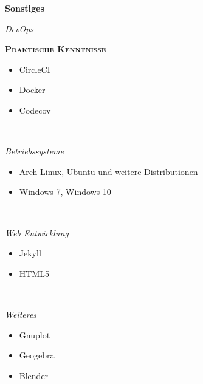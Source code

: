 \documentclass[8pt]{article}
\newcommand{\cvEducationHeading}[2]{%
  {\centering\colorbox{cvBackgroundColor}{\parbox{0.98\linewidth}{\textbf{#1} \hfill \textit{\footnotesize #2}}}} \par
}
\newenvironment{cvEducationItem}[2]{
  \medskip
  \par
  \begin{minipage}[c]{0.15\linewidth}
    \raggedleft
    \footnotesize
    \textit{#1}
  \end{minipage}
  \quad
  \vrule
  \quad
  \begin{minipage}[t]{0.7\linewidth}
    \textsc{\color{cvColor} \textbf{#2}}
    \footnotesize
    \begin{itemize}[itemsep=0mm, leftmargin=3mm]
}{
    \end{itemize}
  \end{minipage}
  \\[0.5em]
}
\begin{document}
  \newpage
  \cvEducationHeading{Sonstiges}{}
  \begin{multicols}{2}
  \begin{cvEducationItem}{DevOps}{Praktische Kenntnisse}
    \item CircleCI
    \item Docker
    \item Codecov
  \end{cvEducationItem}
  \begin{cvEducationItem}{Betriebssysteme}{}
    \item Arch Linux, Ubuntu und weitere Distributionen
    \item Windows 7, Windows 10
  \end{cvEducationItem}
  \begin{cvEducationItem}{Web Entwicklung}{}
    \item Jekyll
    \item HTML5
  \end{cvEducationItem}
  \begin{cvEducationItem}{Weiteres}{}
    \item Gnuplot
    \item Geogebra
    \item Blender
  \end{cvEducationItem}
  \end{multicols}
\end{document}
